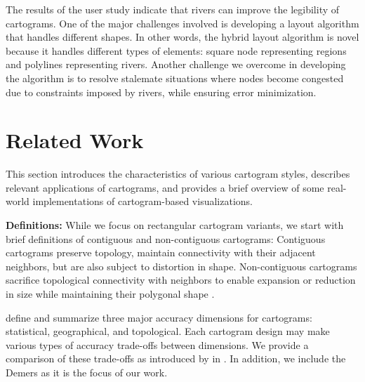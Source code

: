 \documentclass[Afour,sagev,times]{sagej}
\newcommand{\bobgraph}[1]{\noindent\textbf{#1}}
\begin{document}
The results of the user study indicate that rivers can improve the legibility of cartograms.
One of the major challenges involved is developing a layout algorithm that handles different shapes.
In other words, the hybrid layout algorithm is novel because it handles different types of elements: square node representing regions and polylines representing rivers.
Another challenge we overcome in developing the algorithm is to resolve stalemate situations where nodes become congested due to constraints imposed by rivers, while ensuring error minimization.

\section{Related Work}
\label{sec:RelatedWork}

This section introduces the characteristics of various cartogram styles, describes relevant applications of cartograms, and provides a brief overview of some real-world implementations of cartogram-based visualizations.

\bobgraph{Definitions: }While we focus on rectangular cartogram variants, we start with brief definitions of contiguous and non-contiguous cartograms: Contiguous cartograms preserve topology, maintain connectivity with their adjacent neighbors, but are also subject to distortion in shape.
Non-contiguous cartograms sacrifice topological connectivity with neighbors to enable expansion or reduction in size while maintaining their polygonal shape \cite{dent2009Cartography}.

\citet{nusrat2016State} define and summarize three major accuracy dimensions for cartograms: statistical, geographical, and topological.
Each cartogram design may make various types of accuracy trade-offs between dimensions.
We provide a comparison of these trade-offs as introduced by \citet{nusrat2016State} in .
In addition, we include the Demers as it is the focus of our work.
\end{document}
